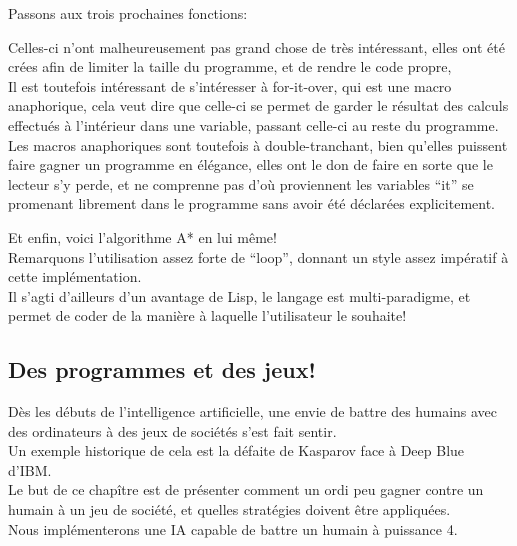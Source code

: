 \documentclass[a4paper, 12pt]{article}
\newcommand{\pather}[1]{
  
}
\numberwithin{equation}{subsection}
\begin{document}
Passons aux trois prochaines fonctions:
\pather{71-85}
Celles-ci n'ont malheureusement pas grand chose de très intéressant,
elles ont été crées afin de limiter la taille du programme, et de rendre le code propre, \\
Il est toutefois intéressant de s'intéresser à for-it-over, qui est une macro anaphorique, cela veut dire que celle-ci se permet de garder le résultat des calculs effectués à l'intérieur dans une variable, passant celle-ci au reste du programme. \\
Les macros anaphoriques sont toutefois à double-tranchant, bien qu'elles puissent faire gagner un programme en élégance, elles ont le don de faire en sorte que le lecteur s'y perde, et ne comprenne pas d'où proviennent les variables ``it'' se promenant librement dans le programme sans avoir été déclarées explicitement.
\pather{89-130}
Et enfin, voici l'algorithme A* en lui même! \\
Remarquons l'utilisation assez forte de ``loop'', donnant un style assez impératif à cette implémentation. \\
Il s'agti d'ailleurs d'un avantage de Lisp, le langage est multi-paradigme, et permet de coder de la manière à laquelle l'utilisateur le souhaite! \\
\subsection{Des programmes et des jeux!}
Dès les débuts de l'intelligence artificielle, une envie de battre des humains avec des ordinateurs à des jeux de sociétés s'est fait sentir. \\Un exemple historique de cela est la défaite de Kasparov face à Deep Blue d'IBM.\\
Le but de ce chapître est de présenter comment un ordi peu gagner contre un humain à un jeu de société, et quelles stratégies doivent être appliquées.\\
Nous implémenterons une IA capable de battre un humain à puissance 4.\\
\end{document}
